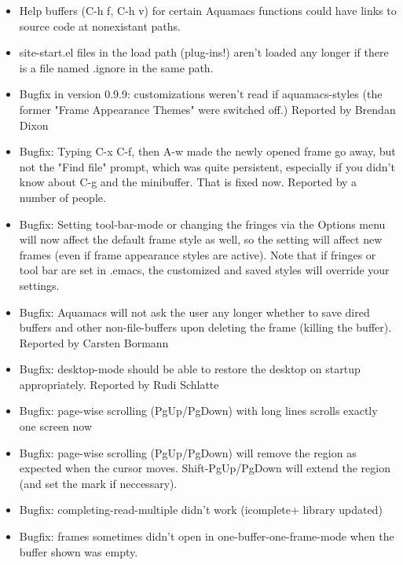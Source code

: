 \begin{itemize}
\item  Help buffers (C-h f, C-h v) for certain Aquamacs functions could
	have links to source code at nonexistant paths.

\item  site-start.el files in the load path (plug-ins!) aren't loaded
	any longer if there is a file named .ignore in the same path.

\item  Bugfix in version 0.9.9: customizations weren't read if
	aquamacs-styles (the former "Frame Appearance Themes" were
	switched off.)
	Reported by Brendan Dixon
	

\item  Bugfix: Typing C-x C-f, then A-w made the newly opened frame go
	away, but not the "Find file" prompt, which was quite persistent,
	especially if you didn't know about C-g and the minibuffer. That
	is fixed now. 
	Reported by a number of people.
	
\item  Bugfix: Setting tool-bar-mode or changing the fringes via the
	Options menu will now affect the default frame style as well, so
	the setting will affect new frames (even if frame appearance
	styles are active). Note that if fringes or tool bar are set in
	.emacs, the customized and saved styles will override your
	settings. 
	
\item  Bugfix: Aquamacs will not ask the user any longer whether to
	save dired buffers and other non-file-buffers upon deleting the
	frame (killing the buffer).
	Reported by Carsten Bormann

\item  Bugfix: desktop-mode should be able to restore the desktop on
	startup appropriately. 
	Reported by Rudi Schlatte
	
\item  Bugfix: page-wise scrolling (PgUp/PgDown) with long lines
	scrolls exactly one screen now

\item  Bugfix: page-wise scrolling (PgUp/PgDown) will remove the region
	as expected when the cursor moves. Shift-PgUp/PgDown will extend
	the region (and set the mark if neccessary).
	
\item  Bugfix: completing-read-multiple didn't work (icomplete+ library
	updated)   

\item  Bugfix: frames sometimes didn't open in
	one-buffer-one-frame-mode when the buffer shown was empty.
	

\end{itemize}

